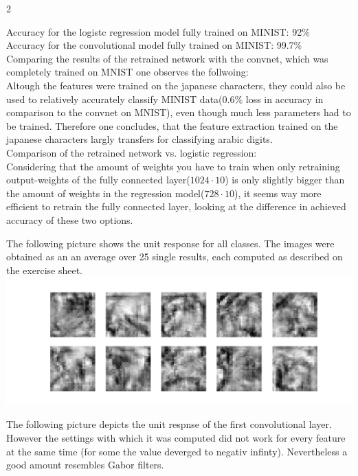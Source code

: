\documentclass{article}
\begin{document}
\begin{ukon-infie}[3.12.17]{2}
\begin{exercise}[p=20]{}
{Accuracy for the logistc regression model fully trained on MINIST: 92\% \\
Accuracy for the convolutional model fully trained on MINIST: 99.7\% \\
			
Comparing the results of the retrained network with the convnet, which was completely trained on MNIST one observes the follwoing:\\
Altough the features were trained on the japanese characters, they could also be used to relatively accurately classify MINIST data(0.6\% loss in accuracy in comparison to the convnet on MNIST), even though much less parameters had to be trained. Therefore one concludes, that the feature extraction trained on the japanese characters largly transfers for classifying arabic digits.\\

Comparison of the retrained network vs. logistic regression:\\
Considering that the amount of weights you have to train when only retraining output-weights of the fully connected layer($1024 \cdot 10$) is only slightly bigger than the amount of weights in the regression model($728 \cdot 10$), it seems way more efficient to retrain the fully connected layer, looking at the difference in achieved accuracy of these two options.\\		}
		\end{exercise}
		\begin{exercise}[p=20]{}
		
		The following picture shows the unit response for all classes. The images were obtained as an an average over 25 single results, each computed as described on the exercise sheet.\\
		\includegraphics[scale=0.5]{unit_resonse_final_layer_avg25.png}
		
		The following picture depicts the unit respnse of the first convolutional layer. However the settings with which it was computed did not work for every feature at the same time (for some the value deverged to negativ infinty). Nevertheless a good amount resembles Gabor filters.
		

\end{exercise}
\end{ukon-infie}
\end{document}
